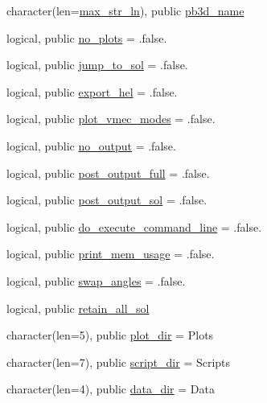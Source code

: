 \begin{DoxyCompactItemize}
character(len=\hyperlink{namespacenum__vars_a3ff2bb983ee80a6735277d6789e6ce7c}{max\+\_\+str\+\_\+ln}), public \hyperlink{namespacenum__vars_a8b3ab3b12cddc0c3e60c3430912b5f3c}{pb3d\+\_\+name}
\item 
logical, public \hyperlink{namespacenum__vars_afe223f0c9580de8bf52d2cedc2ab2ee8}{no\+\_\+plots} = .false.
\item 
logical, public \hyperlink{namespacenum__vars_acd9fb4b84728c986d5ecde709dcac940}{jump\+\_\+to\+\_\+sol} = .false.
\item 
logical, public \hyperlink{namespacenum__vars_aa1342b6b43268bd10bb254fa9bf754f0}{export\+\_\+hel} = .false.
\item 
logical, public \hyperlink{namespacenum__vars_a89067eb4dc3fcdcc85d7cf185d3774ea}{plot\+\_\+vmec\+\_\+modes} = .false.
\item 
logical, public \hyperlink{namespacenum__vars_a324342d6240045750e38ef545801c49d}{no\+\_\+output} = .false.
\item 
logical, public \hyperlink{namespacenum__vars_a7d65e7e9a9c8d9882929fc014b81a81b}{post\+\_\+output\+\_\+full} = .false.
\item 
logical, public \hyperlink{namespacenum__vars_a500deb6ae4c6ba1171c44513e1aac62b}{post\+\_\+output\+\_\+sol} = .false.
\item 
logical, public \hyperlink{namespacenum__vars_ad5ba241cde0a99cdd5b3d6a6c0340e5c}{do\+\_\+execute\+\_\+command\+\_\+line} = .false.
\item 
logical, public \hyperlink{namespacenum__vars_a28bf4f706f43af630ecc697dec01654c}{print\+\_\+mem\+\_\+usage} = .false.
\item 
logical, public \hyperlink{namespacenum__vars_adaf8e128a1b232b8231305be41a55bdc}{swap\+\_\+angles} = .false.
\item 
logical, public \hyperlink{namespacenum__vars_adc6255c76bb27f763817adc8e2d80658}{retain\+\_\+all\+\_\+sol}
\item 
character(len=5), public \hyperlink{namespacenum__vars_a63868c5912af08559dcdd2db31e68696}{plot\+\_\+dir} = \textquotesingle{}Plots\textquotesingle{}
\item 
character(len=7), public \hyperlink{namespacenum__vars_a2b5f419579cb2d0ac2adda364be58fb5}{script\+\_\+dir} = \textquotesingle{}Scripts\textquotesingle{}
\item 
character(len=4), public \hyperlink{namespacenum__vars_af48173a7062997585f7a7ca9363290b3}{data\+\_\+dir} = \textquotesingle{}Data\textquotesingle{}
\item 

\end{DoxyCompactItemize}

